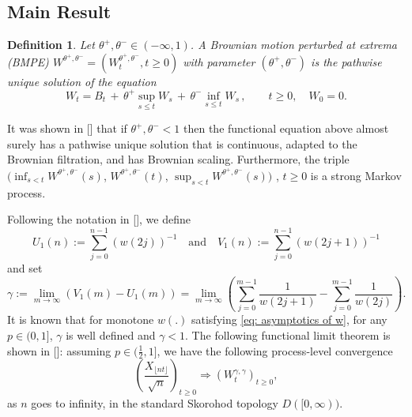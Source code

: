 \documentclass[twoside,12pt,a4paper]{article}
\newtheorem{definition}{Definition}[section]
\numberwithin{equation}{section}
\begin{document}
	
	

	\subsection{Main Result}
	\begin{definition}
		\label{defn:BMPE}
		Let $\theta^+, \theta^- \in (- \infty , 1)$. A Brownian motion perturbed at
		extrema (BMPE) $W^{\theta^+, \theta^-} = \left(W^{\theta^+, \theta^-}_t, t\geq 0\right)$ with parameter  $(\theta^+, \theta^-)$ is the pathwise unique solution of the equation
		$$
		W_t = B_t \,+\, \theta^+ \sup_{s\leq t} W_s  \,+\, \theta^- \inf_{s\leq t} W_s \,,   \qquad t \ge 0, \quad W_0 = 0.
		$$
	\end{definition}
	It was shown in [\cite{PW97, CD99}] that if $\theta^+, \theta^- < 1$ then the functional equation above almost surely has a pathwise unique solution that is continuous, adapted to the Brownian filtration, and has Brownian scaling. 
	Furthermore, the triple 
	$\big(\inf_{s < t} W^{\theta^{+}, \theta^{-}}(s)$, 
	$W^{\theta^{+}, \theta^{-}}(t) $, 
	$\sup _{s<t} W^{\theta^{+}, \theta^{-}}(s)\big)$
	, $t \geq 0$ is a strong Markov process.

	Following the notation in [\cite{T96}], we define
	\[
		U_1(n):=\sum_{j=0}^{n-1}(w(2 j))^{-1} \quad \text{and} \quad
		V_1(n):=\sum_{j=0}^{n-1}(w(2 j+1))^{-1}
	\]
	and set
	\begin{equation}
		\label{eq: gamma}
		\gamma:= \lim_{m\to \infty}\left( V_1(m) - U_1(m) \right) =\lim_{m\to \infty} \left( \sum_{j=0}^{m-1} \frac{1}{ w(2j+1)}-  \sum_{j=0}^{m-1}  \frac{1}{w(2j)} \right) 
	.\end{equation}
	It is known that for monotone $w(.)$ satisfying \eqref{eq: asymptotics of w}, for any $p\in (0,1]$, $\gamma$
	is well defined and ${\gamma<1}$. 
	The following functional limit theorem is shown in [\cite{KMP22}]: assuming $p\in (\frac{1}{2},1]$, we have the following process-level convergence
	\[
	\left(  \frac{X_{\lfloor nt \rfloor }}{\sqrt{n}}  \right)_{t\geq 0} \Longrightarrow \left( W^{\gamma,\gamma}_{t}\right)_{t\geq 0},
	\] 
	as $n$ goes to infinity, in the standard Skorohod topology $D([0,\infty) ).$
	
\end{document}
